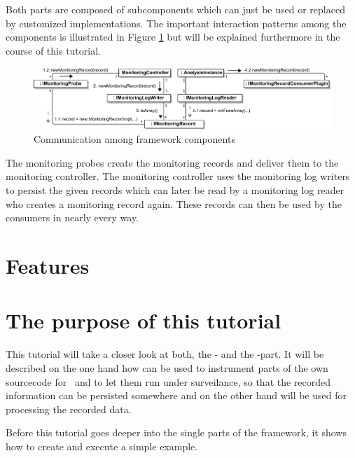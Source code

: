 \noindent Both parts are composed of subcomponents which can just be used or %
replaced by customized implementations. The important interaction patterns among %
the components is illustrated in Figure \ref{Figure:KiekerCommunicationDiagram} %
but will be explained furthermore in the course of this tutorial. %

\begin{figure}[H]\centering
\includegraphics[width=1\textwidth]{images/kiekerCommunications-revisedReArranged-woMonitoringLog-bw-newNames}
\caption{Communication among \Kieker{} framework components}
\label{Figure:KiekerCommunicationDiagram}
\end{figure}
		
\noindent\notify The monitoring probes create the monitoring records and deliver %
them to the monitoring controller. The monitoring controller uses the monitoring %
log writers to persist the given records which can later be read by a monitoring %
log reader who creates a monitoring record again. These records can then be used %
by the consumers in nearly every way.

\section{Features}
	
\section{The purpose of this tutorial}
This tutorial will take a closer look at both, the \KiekerMonitoringPart{}- and %
the \KiekerAnalysisPart-part. It will be described on the one hand how %
\KiekerMonitoringPart{}  can be used to instrument parts of the own sourcecode %
for \Kieker\  and to let them run under surveilance, so that the recorded %
information can be persisted somewhere and on the other hand \KiekerAnalysisPart{} %
will be used for processing the recorded data.

Before this tutorial goes deeper into the single parts of the framework, it shows how to create and execute a simple example.